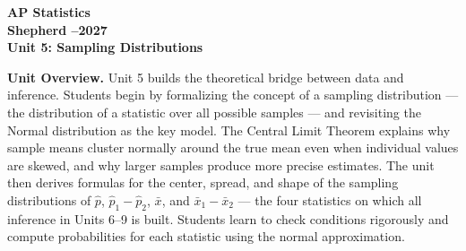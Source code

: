 \documentclass[10pt]{article}
\begin{document}
\vspace{-1.3in}

\begin{center}
  {\color{white}\bfseries\fontsize{28}{34}\selectfont AP Statistics}\\[8pt]
  {\color{goldacc}\bfseries\Large Shepherd --2027}\\[14pt]
  {\color{white}\bfseries\LARGE Unit 5: Sampling Distributions}\\[4pt]
\end{center}

\vspace{0.30in}

\begin{tcolorbox}[colback=sky,colframe=navy,boxrule=0.9pt,arc=2mm,
    left=4mm,right=4mm,top=3mm,bottom=3mm]
  \textbf{Unit Overview.}\quad
  Unit 5 builds the theoretical bridge between data and inference. Students begin by
  formalizing the concept of a sampling distribution --- the distribution of a statistic
  over all possible samples --- and revisiting the Normal distribution as the key model.
  The Central Limit Theorem explains why sample means cluster normally around the true
  mean even when individual values are skewed, and why larger samples produce more precise
  estimates. The unit then derives formulas for the center, spread, and shape of the
  sampling distributions of $\hat{p}$, $\hat{p}_1 - \hat{p}_2$, $\bar{x}$, and
  $\bar{x}_1 - \bar{x}_2$ --- the four statistics on which all inference in Units 6--9
  is built. Students learn to check conditions rigorously and compute probabilities for
  each statistic using the normal approximation.
\end{tcolorbox}

\vspace{0.22in}
\end{document}
